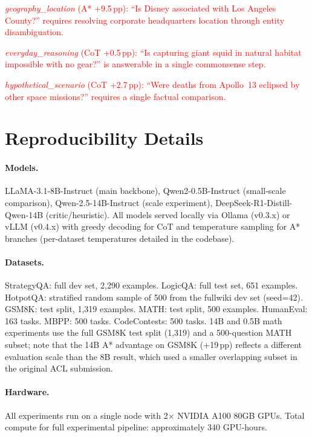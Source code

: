 \documentclass[11pt]{article}
\begin{document}
{\textcolor{red}{\emph{geography\_location} (A* +9.5\,pp): ``Is Disney associated with Los Angeles County?'' requires resolving corporate headquarters location through entity disambiguation.}

\textcolor{red}{\emph{everyday\_reasoning} (CoT +0.5\,pp): ``Is capturing giant squid in natural habitat impossible with no gear?'' is answerable in a single commonsense step.}

\textcolor{red}{\emph{hypothetical\_scenario} (CoT +2.7\,pp): ``Were deaths from Apollo~13 eclipsed by other space missions?'' requires a single factual comparison.}

\section{Reproducibility Details}
\label{app:reproducibility}

\paragraph{Models.} LLaMA-3.1-8B-Instruct (main backbone), Qwen2-0.5B-Instruct (small-scale comparison), Qwen-2.5-14B-Instruct (scale experiment), DeepSeek-R1-Distill-Qwen-14B (critic/heuristic). All models served locally via Ollama (v0.3.x) or vLLM (v0.4.x) with greedy decoding for CoT and temperature sampling for A* branches (per-dataset temperatures detailed in the codebase).

\paragraph{Datasets.} StrategyQA: full dev set, 2{,}290 examples. LogicQA: full test set, 651 examples. HotpotQA: stratified random sample of 500 from the fullwiki dev set (seed=42). GSM8K: test split, 1{,}319 examples. MATH: test split, 500 examples. HumanEval: 163 tasks. MBPP: 500 tasks. CodeContests: 500 tasks. 14B and 0.5B math experiments use the full GSM8K test split (1{,}319) and a 500-question MATH subset; note that the 14B A* advantage on GSM8K (+19\,pp) reflects a different evaluation scale than the 8B result, which used a smaller overlapping subset in the original ACL submission.

\paragraph{Hardware.} All experiments run on a single node with 2$\times$ NVIDIA A100 80GB GPUs. Total compute for full experimental pipeline: approximately 340 GPU-hours.

}
\end{document}
